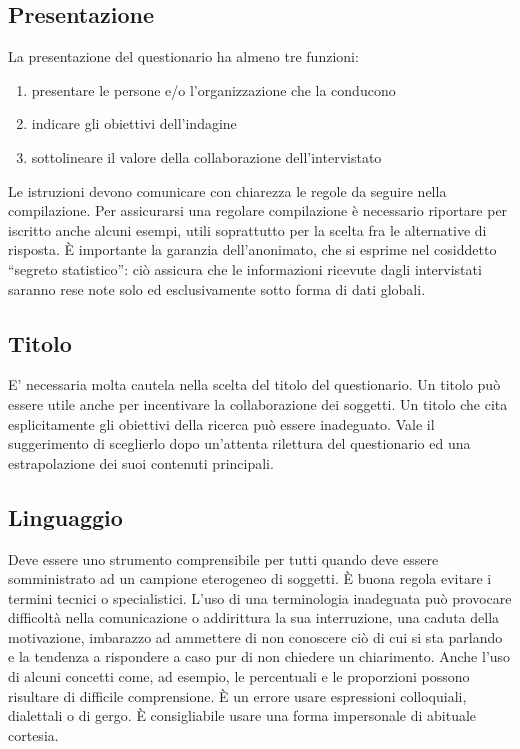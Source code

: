 \subsection{Presentazione}
La presentazione del questionario ha almeno tre funzioni:
\begin{enumerate}
	\item presentare le persone e/o l’organizzazione che la conducono
	\item indicare gli obiettivi dell’indagine
	\item sottolineare il valore della collaborazione dell'intervistato
\end{enumerate}
Le istruzioni devono comunicare con chiarezza le regole da seguire nella compilazione. Per assicurarsi una regolare compilazione è necessario riportare per iscritto anche alcuni esempi, utili soprattutto per la scelta fra le alternative di risposta. È importante la garanzia dell'anonimato, che si esprime nel cosiddetto “segreto statistico”: ciò assicura che le informazioni ricevute dagli intervistati saranno rese note solo ed esclusivamente sotto forma di dati globali.

\subsection{Titolo}
E’ necessaria molta cautela nella scelta del titolo del questionario.\newline
Un titolo può essere utile anche per incentivare la collaborazione dei soggetti. \newline
Un titolo che cita esplicitamente gli obiettivi della ricerca può essere inadeguato. Vale il suggerimento di sceglierlo dopo un’attenta rilettura del questionario ed una estrapolazione dei suoi contenuti principali.

\subsection{Linguaggio}
Deve essere uno strumento comprensibile per tutti quando deve essere somministrato ad un campione eterogeneo di soggetti.\newline
È buona regola evitare i termini tecnici o specialistici. L’uso di una terminologia inadeguata può provocare difficoltà nella comunicazione o addirittura la sua interruzione, una caduta della motivazione, imbarazzo ad ammettere di non conoscere ciò di cui si sta parlando e la tendenza a rispondere a caso pur di non chiedere un chiarimento. Anche l’uso di alcuni concetti come, ad esempio, le percentuali e le proporzioni possono risultare di difficile comprensione.\newline
È un errore usare espressioni colloquiali, dialettali o di gergo. È consigliabile usare una forma impersonale di abituale cortesia.

